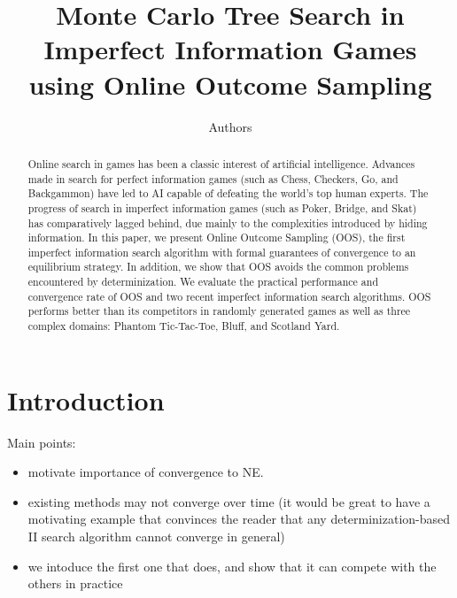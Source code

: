 \documentclass[letterpaper]{article}
\begin{document}
%
\title{Monte Carlo Tree Search in Imperfect Information Games\\using Online Outcome Sampling}
\author{Authors}


\maketitle

\begin{abstract}
Online search in games has been a classic interest of artificial intelligence.
Advances made in search for perfect information games (such as Chess, Checkers, Go, and Backgammon) have led to AI capable of defeating the world's top human experts. 
The progress of search in imperfect information games (such as Poker, Bridge, and Skat) has comparatively lagged behind, due mainly to the complexities introduced by hiding information. 
In this paper, we present Online Outcome Sampling (OOS), the first imperfect information search algorithm with formal guarantees of convergence to an equilibrium strategy.   
In addition, we show that OOS avoids the common problems encountered by determinization.
We evaluate the practical performance and convergence rate of OOS and two recent imperfect information search algorithms. OOS performs better than its competitors in randomly generated games as well as three complex domains: Phantom Tic-Tac-Toe, Bluff, and Scotland Yard.  
\end{abstract}

\section{Introduction}

Main points: 
\begin{itemize}
\item motivate importance of convergence to NE. 
\item existing methods may not converge over time (it would be great to have a motivating example that convinces the reader that any determinization-based II search algorithm cannot converge in general)
\item we intoduce the first one that does, and show that it can compete with the others in practice
\end{itemize}
\end{document}
